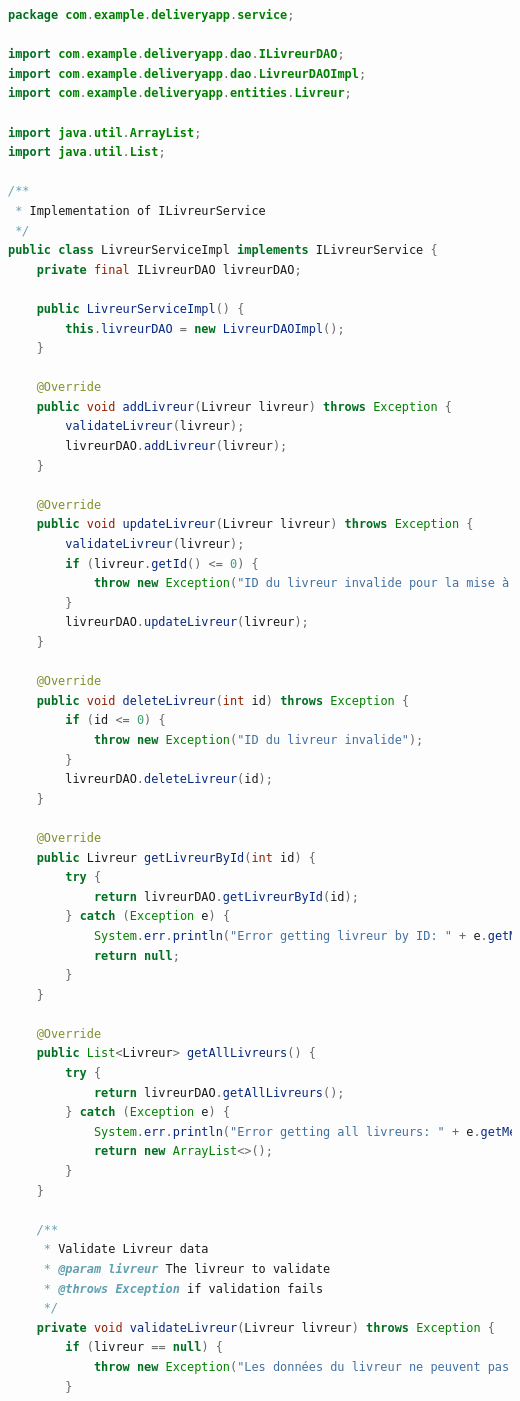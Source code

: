 \documentclass{rapportENSIAS}
\begin{document}
\begin{lstlisting}[language=Java, caption=Impl\'{e}mentation LivreurServiceImpl compl\`{e}te]
package com.example.deliveryapp.service;

import com.example.deliveryapp.dao.ILivreurDAO;
import com.example.deliveryapp.dao.LivreurDAOImpl;
import com.example.deliveryapp.entities.Livreur;

import java.util.ArrayList;
import java.util.List;

/**
 * Implementation of ILivreurService
 */
public class LivreurServiceImpl implements ILivreurService {
    private final ILivreurDAO livreurDAO;
    
    public LivreurServiceImpl() {
        this.livreurDAO = new LivreurDAOImpl();
    }
    
    @Override
    public void addLivreur(Livreur livreur) throws Exception {
        validateLivreur(livreur);
        livreurDAO.addLivreur(livreur);
    }
    
    @Override
    public void updateLivreur(Livreur livreur) throws Exception {
        validateLivreur(livreur);
        if (livreur.getId() <= 0) {
            throw new Exception("ID du livreur invalide pour la mise à jour");
        }
        livreurDAO.updateLivreur(livreur);
    }
    
    @Override
    public void deleteLivreur(int id) throws Exception {
        if (id <= 0) {
            throw new Exception("ID du livreur invalide");
        }
        livreurDAO.deleteLivreur(id);
    }
    
    @Override
    public Livreur getLivreurById(int id) {
        try {
            return livreurDAO.getLivreurById(id);
        } catch (Exception e) {
            System.err.println("Error getting livreur by ID: " + e.getMessage());
            return null;
        }
    }
    
    @Override
    public List<Livreur> getAllLivreurs() {
        try {
            return livreurDAO.getAllLivreurs();
        } catch (Exception e) {
            System.err.println("Error getting all livreurs: " + e.getMessage());
            return new ArrayList<>();
        }
    }
    
    /**
     * Validate Livreur data
     * @param livreur The livreur to validate
     * @throws Exception if validation fails
     */
    private void validateLivreur(Livreur livreur) throws Exception {
        if (livreur == null) {
            throw new Exception("Les données du livreur ne peuvent pas être nulles");
        }
        

\end{lstlisting}
\end{document}
